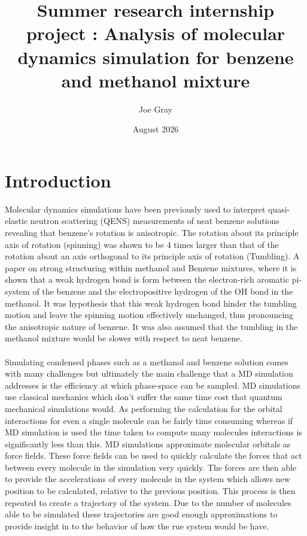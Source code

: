 \documentclass{report}
\title{Summer research internship project : Analysis of molecular dynamics simulation for benzene and methanol mixture}
\author{Joe Gray}
\date{August 2026}
\begin{document}
\maketitle
\section{Introduction}
Molecular dynamics simulations have been previously used to interpret quasi-elastic neutron scattering (QENS) measurements of neat benzene solutions revealing that benzene's rotation is anisotropic. The rotation about its principle axis of rotation (spinning) was shown to be 4 times larger than that of the rotation about an axis orthogonal to its principle axis of rotation (Tumbling). A paper on strong structuring within methanol and Benzene mixtures, where it is shown that a weak hydrogen bond is form between the electron-rich aromatic pi-system of the benzene and the electropositive hydrogen of the OH bond in the methanol. It was hypothesis that this weak hydrogen bond hinder the tumbling motion and leave the spinning motion effectively unchanged, thus pronouncing the anisotropic nature of benzene. It was also assumed that the tumbling in the methanol mixture would be slower with respect to neat benzene.
\paragraph{}
Simulating condensed phases such as a methanol and benzene solution comes with many challenges but ultimately the main challenge that a MD simulation addresses is the efficiency at which phase-space can be sampled. MD simulations use classical mechanics which don't suffer the same time cost that quantum mechanical simulations would. As performing the calculation for the orbital interactions for even a single molecule can be fairly time consuming whereas if MD simulation is used the time taken to compute many molecules interactions is significantly less than this. MD simulations approximate molecular orbitals as force fields. These force fields can be used to quickly calculate the forces that act between every molecule in the simulation very quickly. The forces are then able to provide the accelerations of every molecule in the system which allows new position to be calculated, relative to the previous position. This process is then repeated to create a trajectory of the system. Due to the number of molecules able to be simulated these trajectories are good enough approximations to provide insight in to the behavior of how the rue system would be have.
\end{document}
